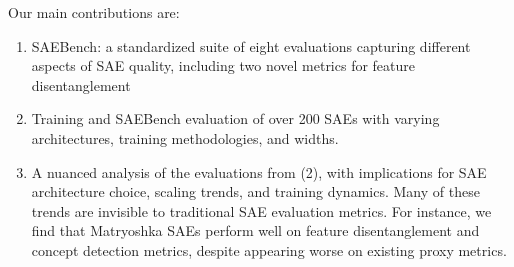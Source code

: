 \documentclass{article}
\theoremstyle{plain}
\theoremstyle{definition}
\theoremstyle{remark}
\begin{document}

Our main contributions are:
\begin{enumerate}%
    \item SAEBench: a standardized suite of eight evaluations capturing different aspects of SAE quality, including two novel metrics for feature disentanglement
    \item Training and SAEBench evaluation of over 200 SAEs with varying architectures, training methodologies, and widths.
    \item A nuanced analysis of the evaluations from (2), with implications for SAE architecture choice, scaling trends, and training dynamics. Many of these trends are invisible to traditional SAE evaluation metrics. For instance, we find that Matryoshka SAEs perform well on feature disentanglement and concept detection metrics, despite appearing worse on existing proxy metrics.
\end{enumerate}


\end{document}
